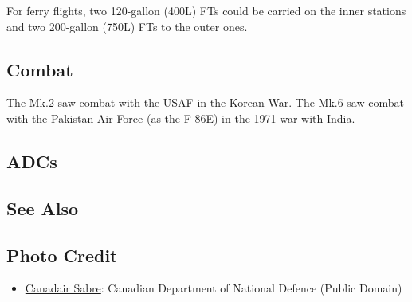 For ferry flights, two 120-gallon (400L) FTs could be carried on the inner stations and two 200-gallon (750L) FTs to the outer ones.

\subsection{Combat}

The Mk.2 saw combat with the USAF in the Korean War. The Mk.6 saw combat with the Pakistan Air Force (as the F-86E) in the 1971 war with India.

\subsection{ADCs}

\begin{adclist}
\end{adclist}

\subsection{See Also}

\begin{typelist}
\end{typelist}

\subsection{Photo Credit}
\begin{itemize}\raggedright
    \item \href{https://commons.wikimedia.org/wiki/File:Canadair_Sabre_0258.jpg}{Canadair Sabre}: Canadian Department of National Defence (Public Domain)
\end{itemize}
